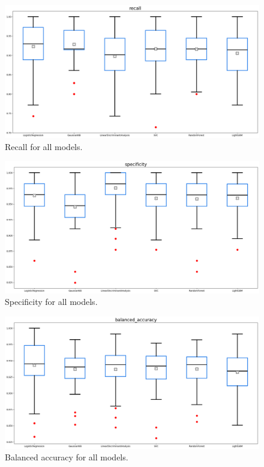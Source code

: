 \documentclass[12pt]{article}
\begin{document}
\begin{figure}[H]
    \centering
    \includegraphics[width=\textwidth]{ims/recall.png}
    \caption{Recall for all models.}
    \label{fig:recall}
\end{figure}

\begin{figure}[H]
    \centering
    \includegraphics[width=\textwidth]{ims/specificity.png}
    \caption{Specificity for all models.}
    \label{fig:specificity}
\end{figure}

\begin{figure}[H]
    \centering
    \includegraphics[width=\textwidth]{ims/balanced_accuracy.png}
    \caption{Balanced accuracy for all models.}
    \label{fig:balanced_accuracy}
\end{figure}
\end{document}

